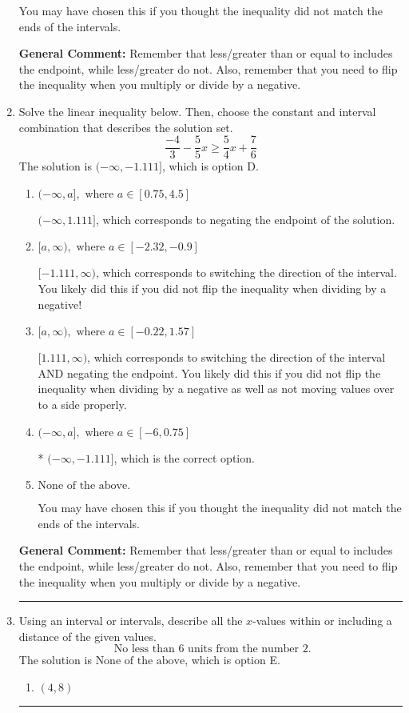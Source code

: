 \documentclass{extbook}[14pt]
\newcommand{\litem}[1]{\item #1

\rule{\textwidth}{0.4pt}}
\begin{document}
\begin{enumerate}
{\begin{enumerate}[label=\Alph*.]
You may have chosen this if you thought the inequality did not match the ends of the intervals.
\end{enumerate}

\textbf{General Comment:} Remember that less/greater than or equal to includes the endpoint, while less/greater do not. Also, remember that you need to flip the inequality when you multiply or divide by a negative.
}
\litem{
Solve the linear inequality below. Then, choose the constant and interval combination that describes the solution set.
\[ \frac{-4}{3} - \frac{5}{5} x \geq \frac{5}{4} x + \frac{7}{6} \]The solution is \( (-\infty, -1.111] \), which is option D.\begin{enumerate}[label=\Alph*.]
\item \( (-\infty, a], \text{ where } a \in [0.75, 4.5] \)

 $(-\infty, 1.111]$, which corresponds to negating the endpoint of the solution.
\item \( [a, \infty), \text{ where } a \in [-2.32, -0.9] \)

 $[-1.111, \infty)$, which corresponds to switching the direction of the interval. You likely did this if you did not flip the inequality when dividing by a negative!
\item \( [a, \infty), \text{ where } a \in [-0.22, 1.57] \)

 $[1.111, \infty)$, which corresponds to switching the direction of the interval AND negating the endpoint. You likely did this if you did not flip the inequality when dividing by a negative as well as not moving values over to a side properly.
\item \( (-\infty, a], \text{ where } a \in [-6, 0.75] \)

* $(-\infty, -1.111]$, which is the correct option.
\item \( \text{None of the above}. \)

You may have chosen this if you thought the inequality did not match the ends of the intervals.
\end{enumerate}

\textbf{General Comment:} Remember that less/greater than or equal to includes the endpoint, while less/greater do not. Also, remember that you need to flip the inequality when you multiply or divide by a negative.
}
\litem{
Using an interval or intervals, describe all the $x$-values within or including a distance of the given values.
\[ \text{ No less than } 6 \text{ units from the number } 2. \]The solution is \( \text{None of the above} \), which is option E.\begin{enumerate}[label=\Alph*.]
\item \( (4, 8) \)


\end{enumerate}}
\end{enumerate}
\end{document}
